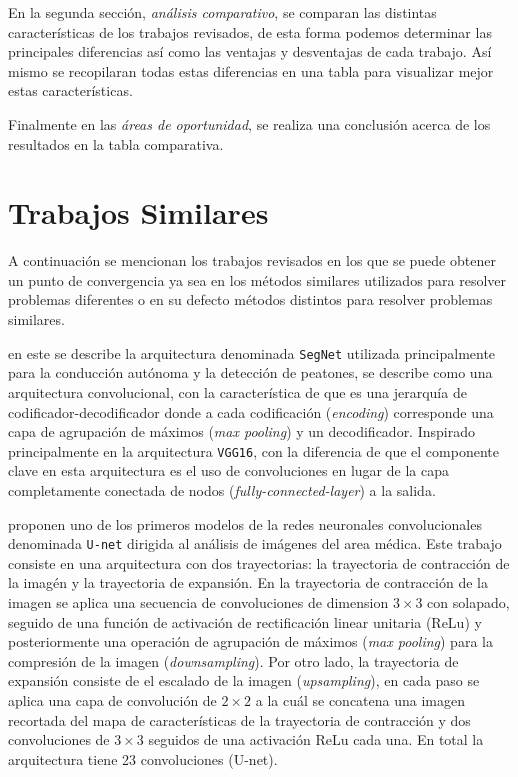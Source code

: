 En la segunda sección, \emph{análisis comparativo}, se comparan las distintas características de los trabajos revisados, de esta forma podemos determinar las principales diferencias así como las ventajas y desventajas de cada trabajo. Así mismo se recopilaran todas estas diferencias en una tabla para visualizar mejor estas características.

Finalmente en las \emph{áreas de oportunidad}, se realiza una conclusión acerca de los resultados en la tabla comparativa.

\section{Trabajos Similares}

A continuación se mencionan los trabajos revisados en los que se puede obtener un punto de convergencia ya sea en los métodos similares utilizados para resolver problemas diferentes o en su defecto métodos distintos para resolver problemas similares.

\citet{DBLP:journals/corr/BadrinarayananK15} en este se describe la arquitectura denominada \texttt{SegNet} utilizada principalmente para la conducción autónoma y la detección de peatones, se describe como una arquitectura convolucional, con la característica de que es una jerarquía de codificador-decodificador donde a cada codificación (\emph{encoding}) corresponde una capa de agrupación de máximos (\emph{max pooling}) y un decodificador. Inspirado principalmente en la arquitectura \texttt{VGG16}, con la diferencia de que el componente clave en esta arquitectura es el uso de convoluciones en lugar de la capa completamente conectada de nodos (\emph{fully-connected-layer}) a la salida.

\citet{DBLP:journals/corr/RonnebergerFB15} proponen uno de los primeros modelos de la redes neuronales convolucionales denominada \texttt{U-net} dirigida al análisis de imágenes del area médica. Este trabajo consiste en una arquitectura con dos trayectorias: la trayectoria de contracción de la imagén y la trayectoria de expansión. En la trayectoria de contracción de la imagen se aplica una secuencia de convoluciones de dimension $3 \times 3$ con solapado, seguido de una función de activación de rectificación linear unitaria (ReLu) y posteriormente una operación de agrupación de máximos (\emph{max pooling}) para la compresión de la imagen (\emph{downsampling}). Por otro lado, la trayectoria de expansión consiste de el escalado de la imagen (\emph{upsampling}), en cada paso se aplica una capa de convolución de $2 \times 2$ a la cuál se concatena una imagen recortada del mapa de características de la trayectoria de contracción y dos convoluciones de $3 \times 3$ seguidos de una activación ReLu cada una. En total la arquitectura tiene 23 convoluciones (U-net).

